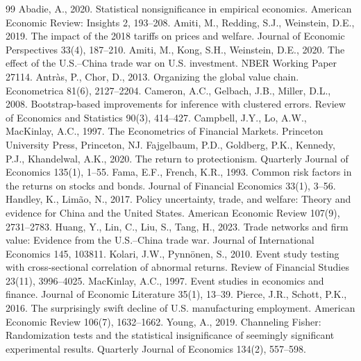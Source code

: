 \documentclass[12pt]{article}
\begin{document}
\begin{thebibliography}{99}
 Abadie, A., 2020. Statistical nonsignificance in empirical
economics. American Economic Review: Insights 2, 193--208.
 Amiti, M., Redding, S.J., Weinstein, D.E., 2019.
The impact of the 2018 tariffs on prices and welfare. Journal of Economic Perspectives
33(4), 187--210.
 Amiti, M., Kong, S.H., Weinstein, D.E., 2020.
The effect of the U.S.--China trade war on U.S. investment. NBER Working Paper 27114.
 Antr\`as, P., Chor, D., 2013.
Organizing the global value chain. Econometrica 81(6), 2127--2204.
 Cameron, A.C., Gelbach, J.B., Miller, D.L., 2008.
Bootstrap-based improvements for inference with clustered errors. Review of Economics and
Statistics 90(3), 414--427.
 Campbell, J.Y., Lo, A.W., MacKinlay, A.C., 1997.
The Econometrics of Financial Markets. Princeton University Press, Princeton, NJ.
 Fajgelbaum, P.D., Goldberg, P.K.,
Kennedy, P.J., Khandelwal, A.K., 2020. The return to protectionism. Quarterly Journal of
Economics 135(1), 1--55.
 Fama, E.F., French, K.R., 1993. Common risk
factors in the returns on stocks and bonds. Journal of Financial Economics 33(1), 3--56.
 Handley, K., Lim\~ao, N., 2017. Policy
uncertainty, trade, and welfare: Theory and evidence for China and the United States.
American Economic Review 107(9), 2731--2783.
 Huang, Y., Lin, C., Liu, S., Tang, H., 2023.
Trade networks and firm value: Evidence from the U.S.--China trade war. Journal of
International Economics 145, 103811.
 Kolari, J.W., Pynn\"onen, S., 2010. Event
study testing with cross-sectional correlation of abnormal returns. Review of Financial
Studies 23(11), 3996--4025.
 MacKinlay, A.C., 1997. Event studies in economics
and finance. Journal of Economic Literature 35(1), 13--39.
 Pierce, J.R., Schott, P.K., 2016. The
surprisingly swift decline of U.S. manufacturing employment. American Economic Review
106(7), 1632--1662.
 Young, A., 2019. Channeling Fisher: Randomization tests and
the statistical insignificance of seemingly significant experimental results. Quarterly
Journal of Economics 134(2), 557--598.
\end{thebibliography}
\end{document}
